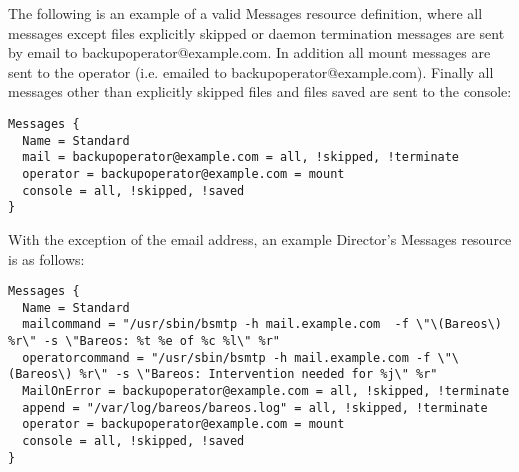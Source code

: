 The following is an example of a valid Messages resource definition, where
all messages except files explicitly skipped or daemon termination messages
are sent by email to backupoperator@example.com.  In addition all mount messages
are sent to the operator (i.e.  emailed to backupoperator@example.com).  Finally
all messages other than explicitly skipped files and files saved are sent
to the console:

\footnotesize
\begin{verbatim}
Messages {
  Name = Standard
  mail = backupoperator@example.com = all, !skipped, !terminate
  operator = backupoperator@example.com = mount
  console = all, !skipped, !saved
}
\end{verbatim}
\normalsize

With the exception of the email address,
an example Director's Messages resource is as follows:

\footnotesize
\begin{verbatim}
Messages {
  Name = Standard
  mailcommand = "/usr/sbin/bsmtp -h mail.example.com  -f \"\(Bareos\) %r\" -s \"Bareos: %t %e of %c %l\" %r"
  operatorcommand = "/usr/sbin/bsmtp -h mail.example.com -f \"\(Bareos\) %r\" -s \"Bareos: Intervention needed for %j\" %r"
  MailOnError = backupoperator@example.com = all, !skipped, !terminate
  append = "/var/log/bareos/bareos.log" = all, !skipped, !terminate
  operator = backupoperator@example.com = mount
  console = all, !skipped, !saved
}
\end{verbatim}
\normalsize
